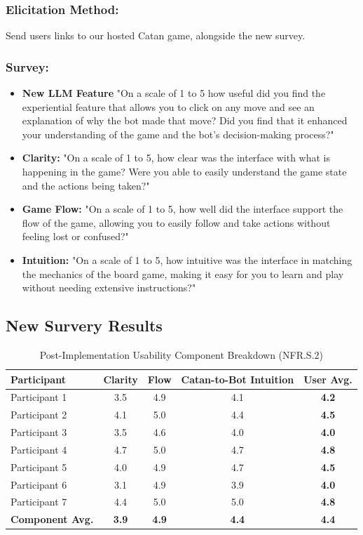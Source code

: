 \documentclass[12pt]{article}
\begin{document}
\subsubsection{Elicitation Method:}
Send users links to our hosted Catan game, alongside the new survey.

\subsubsection{Survey:}
\begin{itemize}
    \item \textbf{New LLM Feature} "On a scale of 1 to 5 how useful did you find the experiential feature that allows you to click on any move and see an explanation of why the bot made that move? Did you find that it enhanced your understanding of the game and the bot's decision-making process?"
    \item \textbf{Clarity:} "On a scale of 1 to 5, how clear was the interface with what is happening in the game? Were you able to easily understand the game state and the actions being taken?"
    \item \textbf{Game Flow:} "On a scale of 1 to 5, how well did the interface support the flow of the game, allowing you to easily follow and take actions without feeling lost or confused?"
    \item \textbf{Intuition:} "On a scale of 1 to 5, how intuitive was the interface in matching the mechanics of the board game, making it easy for you to learn and play without needing extensive instructions?"
\end{itemize}

\subsection{New Survery Results}
\begin{table}[H]
    \centering
    \small
    \begin{tabular}{|l|c|c|c|c|}
    \hline
    \textbf{Participant} & \textbf{Clarity} & \textbf{Flow} & \textbf{Catan-to-Bot Intuition} & \textbf{User Avg.} \\ \hline
    Participant 1 & 3.5 & 4.9 & 4.1 & \textbf{4.2} \\ \hline
    Participant 2 & 4.1 & 5.0 & 4.4 & \textbf{4.5} \\ \hline
    Participant 3 & 3.5 & 4.6 & 4.0 & \textbf{4.0} \\ \hline
    Participant 4 & 4.7 & 5.0 & 4.7 & \textbf{4.8} \\ \hline
    Participant 5 & 4.0 & 4.9 & 4.7 & \textbf{4.5} \\ \hline
    Participant 6 & 3.1 & 4.9 & 3.9 & \textbf{4.0} \\ \hline
    Participant 7 & 4.4 & 5.0 & 5.0 & \textbf{4.8} \\ \hline
    \rowcolor[HTML]{F2F2F2} 
    \textbf{Component Avg.} & \textbf{3.9} & \textbf{4.9} & \textbf{4.4} & \textbf{4.4} \\ \hline
    \end{tabular}
    \caption{Post-Implementation Usability Component Breakdown (NFR.S.2)}
    \end{table}
    
\end{document}
